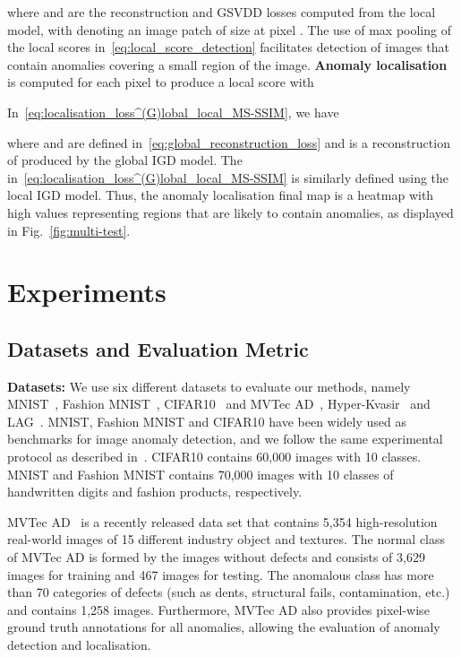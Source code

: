 \documentclass[final]{cvpr}
\begin{document}
where  and  are the reconstruction and GSVDD losses computed from the local model, with  denoting an image patch of size  at pixel .
The use of max pooling of the local scores in~\eqref{eq:local_score_detection} facilitates detection of images that contain anomalies covering a small region of the image.
\textbf{Anomaly localisation} is computed for each pixel  to produce a local score with  

In~\eqref{eq:localisation_loss^(G)lobal_local_MS-SSIM}, we have

where  and  are defined in~\eqref{eq:global_reconstruction_loss} and 
 is a reconstruction of  produced by the global IGD model. The  in~\eqref{eq:localisation_loss^(G)lobal_local_MS-SSIM} is similarly defined using the local IGD model. Thus, the anomaly localisation final map is a 
heatmap with high values representing regions that are likely to contain anomalies, as displayed in Fig.~\ref{fig:multi-test}.






\section{Experiments}


\subsection{Datasets and Evaluation Metric}
\label{sec:datasets_evaluation}

\textbf{Datasets:} We use six different datasets to evaluate our methods, namely MNIST~\cite{lecun2010mnist}, Fashion MNIST~\cite{fmnist}, CIFAR10~\cite{krizhevsky2014cifar} and MVTec AD~\cite{mvtecad}, Hyper-Kvasir~\cite{borgli2020hyperkvasir} and LAG~\cite{li2019attention}. MNIST, Fashion MNIST and CIFAR10 have been widely used as benchmarks for image anomaly detection, and we follow the same experimental protocol as described in~\cite{ocgan,ADGAN,lsa,dsvdd,venkataramanan2019attention,bergmann2020uninformed,gong2019memorizing}. CIFAR10 contains 60,000 images with 10 classes. MNIST and Fashion MNIST contains 70,000 images with 10 classes of handwritten digits and fashion products, respectively. 

MVTec AD~\cite{mvtecad} is a recently released data set that contains 5,354 high-resolution real-world images of 15 different industry object and textures. 
The normal class of MVTec AD is formed by the images without defects and consists of 3,629 images for training and 467 images for testing.
The anomalous class has more than 70 categories of defects
(such as dents, structural fails, contamination, etc.) and contains 1,258 images. 
Furthermore, MVTec AD also provides pixel-wise ground truth annotations for all anomalies, allowing the evaluation of anomaly detection and localisation. 
\end{document}

